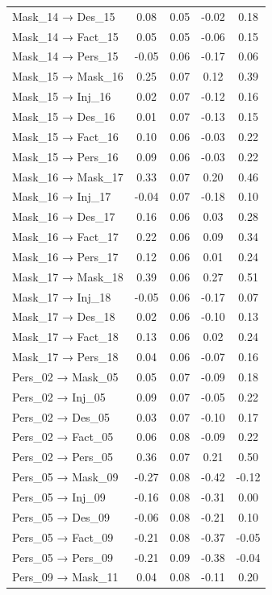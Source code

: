 \documentclass[
  man, donotrepeattitle,floatsintext]{apa6}
\begin{document}
\begin{center}
\begin{ThreePartTable}
{\begin{longtable}{lcccc}
Mask\_14 → Des\_15 & 0.08 & 0.05 & -0.02 & 0.18\\
Mask\_14 → Fact\_15 & 0.05 & 0.05 & -0.06 & 0.15\\
Mask\_14 → Pers\_15 & -0.05 & 0.06 & -0.17 & 0.06\\
Mask\_15 → Mask\_16 & 0.25 & 0.07 & 0.12 & 0.39\\
Mask\_15 → Inj\_16 & 0.02 & 0.07 & -0.12 & 0.16\\
Mask\_15 → Des\_16 & 0.01 & 0.07 & -0.13 & 0.15\\
Mask\_15 → Fact\_16 & 0.10 & 0.06 & -0.03 & 0.22\\
Mask\_15 → Pers\_16 & 0.09 & 0.06 & -0.03 & 0.22\\
Mask\_16 → Mask\_17 & 0.33 & 0.07 & 0.20 & 0.46\\
Mask\_16 → Inj\_17 & -0.04 & 0.07 & -0.18 & 0.10\\
Mask\_16 → Des\_17 & 0.16 & 0.06 & 0.03 & 0.28\\
Mask\_16 → Fact\_17 & 0.22 & 0.06 & 0.09 & 0.34\\
Mask\_16 → Pers\_17 & 0.12 & 0.06 & 0.01 & 0.24\\
Mask\_17 → Mask\_18 & 0.39 & 0.06 & 0.27 & 0.51\\
Mask\_17 → Inj\_18 & -0.05 & 0.06 & -0.17 & 0.07\\
Mask\_17 → Des\_18 & 0.02 & 0.06 & -0.10 & 0.13\\
Mask\_17 → Fact\_18 & 0.13 & 0.06 & 0.02 & 0.24\\
Mask\_17 → Pers\_18 & 0.04 & 0.06 & -0.07 & 0.16\\
Pers\_02 → Mask\_05 & 0.05 & 0.07 & -0.09 & 0.18\\
Pers\_02 → Inj\_05 & 0.09 & 0.07 & -0.05 & 0.22\\
Pers\_02 → Des\_05 & 0.03 & 0.07 & -0.10 & 0.17\\
Pers\_02 → Fact\_05 & 0.06 & 0.08 & -0.09 & 0.22\\
Pers\_02 → Pers\_05 & 0.36 & 0.07 & 0.21 & 0.50\\
Pers\_05 → Mask\_09 & -0.27 & 0.08 & -0.42 & -0.12\\
Pers\_05 → Inj\_09 & -0.16 & 0.08 & -0.31 & 0.00\\
Pers\_05 → Des\_09 & -0.06 & 0.08 & -0.21 & 0.10\\
Pers\_05 → Fact\_09 & -0.21 & 0.08 & -0.37 & -0.05\\
Pers\_05 → Pers\_09 & -0.21 & 0.09 & -0.38 & -0.04\\
Pers\_09 → Mask\_11 & 0.04 & 0.08 & -0.11 & 0.20\\

\end{longtable}}
\end{ThreePartTable}
\end{center}
\end{document}
